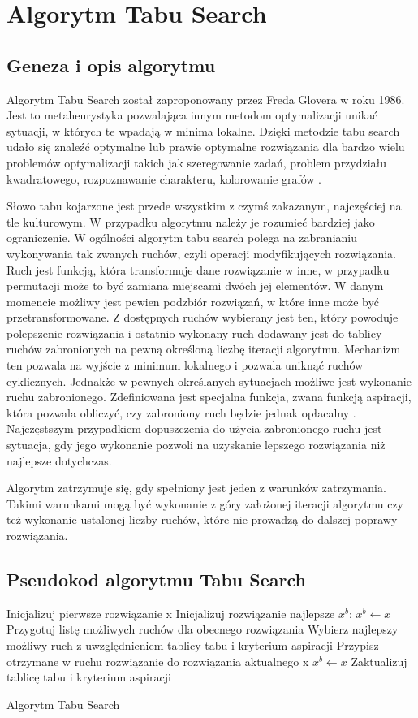 \section{Algorytm Tabu Search}
\label{sec:TS}
\subsection{Geneza i opis algorytmu}
Algorytm Tabu Search został zaproponowany przez Freda Glovera w roku 1986. Jest to metaheurystyka pozwalająca innym metodom optymalizacji unikać sytuacji, w których te wpadają w minima lokalne. Dzięki metodzie tabu search udało się znaleźć optymalne lub prawie optymalne rozwiązania dla bardzo wielu problemów optymalizacji takich jak szeregowanie zadań, problem przydziału kwadratowego, rozpoznawanie charakteru, kolorowanie grafów \cite{TABU}.

Słowo tabu kojarzone jest przede wszystkim z czymś zakazanym, najczęściej na tle kulturowym. W przypadku algorytmu należy je rozumieć bardziej jako ograniczenie. W ogólności algorytm tabu search polega na zabranianiu wykonywania tak zwanych ruchów, czyli operacji modyfikujących rozwiązania. Ruch jest funkcją, która transformuje dane rozwiązanie w inne, w przypadku permutacji może to być zamiana miejscami dwóch jej elementów. W danym momencie możliwy jest pewien podzbiór rozwiązań, w które inne może być przetransformowane. Z dostępnych ruchów wybierany jest ten, który powoduje polepszenie rozwiązania i ostatnio wykonany ruch dodawany jest do tablicy ruchów zabronionych na pewną określoną liczbę iteracji algorytmu. Mechanizm ten pozwala na wyjście z minimum lokalnego i pozwala uniknąć ruchów cyklicznych. Jednakże w pewnych określanych sytuacjach możliwe jest wykonanie ruchu zabronionego. Zdefiniowana jest specjalna funkcja, zwana funkcją aspiracji, która pozwala obliczyć, czy zabroniony ruch będzie jednak opłacalny \cite{META_HEU}. Najczęstszym przypadkiem dopuszczenia do użycia zabronionego ruchu jest sytuacja, gdy jego wykonanie pozwoli na uzyskanie lepszego rozwiązania niż najlepsze dotychczas.

Algorytm zatrzymuje się, gdy spełniony jest jeden z warunków zatrzymania. Takimi warunkami mogą być wykonanie z góry założonej iteracji algorytmu czy też wykonanie ustalonej liczby ruchów, które nie prowadzą do dalszej poprawy rozwiązania.

\subsection{Pseudokod algorytmu Tabu Search}
\begin{algorithm}[H]
	Inicjalizuj pierwsze rozwiązanie x\;
	Inicjalizuj rozwiązanie najlepsze $x^b$: $x^b \leftarrow x$\;
 	{
 		Przygotuj listę możliwych ruchów dla obecnego rozwiązania\;
 		Wybierz najlepszy możliwy ruch z uwzględnieniem tablicy tabu i kryterium aspiracji\;
 		Przypisz otrzymane w ruchu rozwiązanie do rozwiązania aktualnego x\;
 		{
 			$x^b \leftarrow x$
 		} 		
 		Zaktualizuj tablicę tabu i kryterium aspiracji\;		
 	}
 	\caption{Algorytm Tabu Search}
\end{algorithm}


